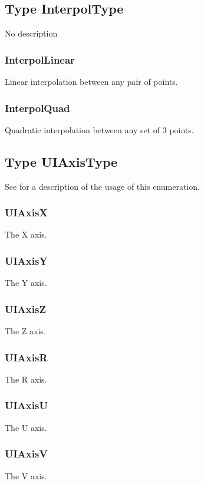 \subsection{Type InterpolType \label{T:InterpolType}}
No description

\subsubsection{InterpolLinear \label{T:InterpolType|InterpolLinear}}
Linear interpolation between any pair of points.

\subsubsection{InterpolQuad \label{T:InterpolType|InterpolQuad}}
Quadratic interpolation between any set of 3 points.

\subsection{Type UIAxisType \label{T:UIAxisType}}
See  for a description of the usage of this enumeration.


\subsubsection{UIAxisX \label{T:UIAxisType|UIAxisX}}
The X axis.

\subsubsection{UIAxisY \label{T:UIAxisType|UIAxisY}}
The Y axis.

\subsubsection{UIAxisZ \label{T:UIAxisType|UIAxisZ}}
The Z axis.

\subsubsection{UIAxisR \label{T:UIAxisType|UIAxisR}}
The R axis.

\subsubsection{UIAxisU \label{T:UIAxisType|UIAxisU}}
The U axis.

\subsubsection{UIAxisV \label{T:UIAxisType|UIAxisV}}
The V axis.

